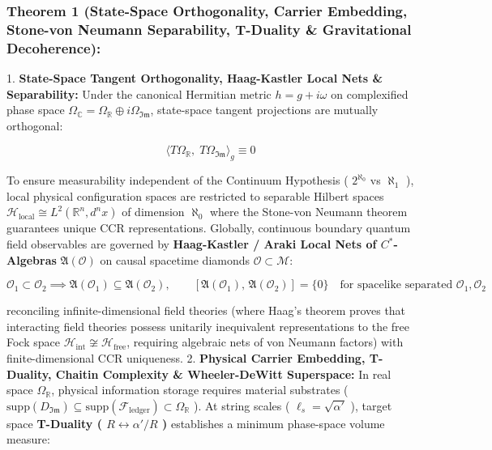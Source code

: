 \documentclass[11pt,a4paper]{article}
\theoremstyle{definition}
\theoremstyle{remark}
\begin{document}
\subsubsection{Theorem 1 (State-Space Orthogonality, Carrier Embedding, Stone-von Neumann Separability, T-Duality \& Gravitational Decoherence):}
1. \textbf{State-Space Tangent Orthogonality, Haag-Kastler Local Nets \& Separability:} Under the canonical Hermitian metric $h = g + i\omega$ on complexified phase space $\Omega_{\mathbb{C}} = \Omega_{\mathbb{R}} \oplus i \Omega_{\mathfrak{Im}}$, state-space tangent projections are mutually orthogonal:


\begin{equation}
\langle T\Omega_{\mathbb{R}}, \; T\Omega_{\mathfrak{Im}} \rangle_g \equiv 0
\end{equation}


To ensure measurability independent of the Continuum Hypothesis ( $2^{\aleph_0}$ vs $\aleph_1$ ), local physical configuration spaces are restricted to separable Hilbert spaces $\mathcal{H}_{\text{local}} \cong L^2(\mathbb{R}^n, d^n x)$ of dimension $\aleph_0$ where the Stone-von Neumann theorem guarantees unique CCR representations. Globally, continuous boundary quantum field observables are governed by \textbf{Haag-Kastler / Araki Local Nets of $C^*$-Algebras} $\mathfrak{A}(\mathcal{O})$ on causal spacetime diamonds $\mathcal{O} \subset \mathcal{M}$:


\begin{equation}
\boxed{\mathcal{O}_1 \subset \mathcal{O}_2 \implies \mathfrak{A}(\mathcal{O}_1) \subseteq \mathfrak{A}(\mathcal{O}_2), \qquad [\mathfrak{A}(\mathcal{O}_1), \, \mathfrak{A}(\mathcal{O}_2)] = \{0\} \quad \text{for spacelike separated } \mathcal{O}_1, \mathcal{O}_2}
\end{equation}


reconciling infinite-dimensional field theories (where Haag's theorem proves that interacting field theories possess unitarily inequivalent representations to the free Fock space $\mathcal{H}_{\text{int}} \not\cong \mathcal{H}_{\text{free}}$, requiring algebraic nets of von Neumann factors) with finite-dimensional CCR uniqueness.
2. \textbf{Physical Carrier Embedding, T-Duality, Chaitin Complexity \& Wheeler-DeWitt Superspace:} In real space $\Omega_{\mathbb{R}}$, physical information storage requires material substrates ( $\mathrm{supp}(D_{\mathfrak{Im}}) \subseteq \mathrm{supp}(\mathcal{F}_{\text{ledger}}) \subset \Omega_{\mathbb{R}}$ ). At string scales ( $\ell_s = \sqrt{\alpha'}$ ), target space \textbf{T-Duality ( $R \leftrightarrow \alpha'/R$ )} establishes a minimum phase-space volume measure:
\end{document}
